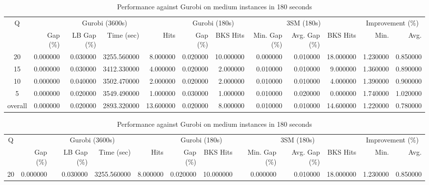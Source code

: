 \begin{table}[H]
\caption{Performance against Gurobi on medium instances in 180 seconds}
\label{tab:3lm_resuts150T180}
\begin{tabular}{c rrrr rr rrr rr}
\toprule
Q & \multicolumn{4}{c}{Gurobi (3600s)} & \multicolumn{2}{c}{Gurobi (180s)} & \multicolumn{3}{c}{3SM (180s)} & \multicolumn{2}{c}{Improvement (\%)} \\
 & Gap (\%) & LB Gap (\%) & Time (sec) & Hits & Gap (\%) & BKS Hits & Min. Gap (\%) & Avg. Gap (\%) & BKS Hits & Min. & Avg. \\
\midrule
\cmidrule(lr){1-1} \cmidrule(lr){2-5} \cmidrule(lr){2-5} \cmidrule(lr){6-7} \cmidrule(lr){8-10} \cmidrule(lr){11-12}
20 & 0.000000 & 0.030000 & 3255.560000 & 8.000000 & 0.020000 & 10.000000 & 0.000000 & 0.010000 & 18.000000 & 1.230000 & 0.850000 \\
15 & 0.000000 & 0.030000 & 3412.330000 & 4.000000 & 0.020000 & 2.000000 & 0.010000 & 0.010000 & 9.000000 & 1.360000 & 0.890000 \\
10 & 0.000000 & 0.040000 & 3502.470000 & 2.000000 & 0.020000 & 2.000000 & 0.010000 & 0.010000 & 4.000000 & 1.390000 & 0.900000 \\
5 & 0.000000 & 0.020000 & 3549.490000 & 1.000000 & 0.030000 & 1.000000 & 0.010000 & 0.020000 & 0.000000 & 1.740000 & 1.020000 \\
\midrule
overall & 0.000000 & 0.020000 & 2893.320000 & 13.600000 & 0.020000 & 8.000000 & 0.010000 & 0.010000 & 14.600000 & 1.220000 & 0.780000 \\
\bottomrule
\end{tabular}
\end{table}\begin{table}[H]
\caption{Performance against Gurobi on medium instances in 180 seconds}
\label{tab:3lm_resuts150T180}
\begin{tabular}{c rrrr rr rrr rr}
\toprule
Q & \multicolumn{4}{c}{Gurobi (3600s)} & \multicolumn{2}{c}{Gurobi (180s)} & \multicolumn{3}{c}{3SM (180s)} & \multicolumn{2}{c}{Improvement (\%)} \\
 & Gap (\%) & LB Gap (\%) & Time (sec) & Hits & Gap (\%) & BKS Hits & Min. Gap (\%) & Avg. Gap (\%) & BKS Hits & Min. & Avg. \\
\midrule
\cmidrule(lr){1-1} \cmidrule(lr){2-5} \cmidrule(lr){2-5} \cmidrule(lr){6-7} \cmidrule(lr){8-10} \cmidrule(lr){11-12}
20 & 0.000000 & 0.030000 & 3255.560000 & 8.000000 & 0.020000 & 10.000000 & 0.000000 & 0.010000 & 18.000000 & 1.230000 & 0.850000 \\

\end{tabular}
\end{table}
